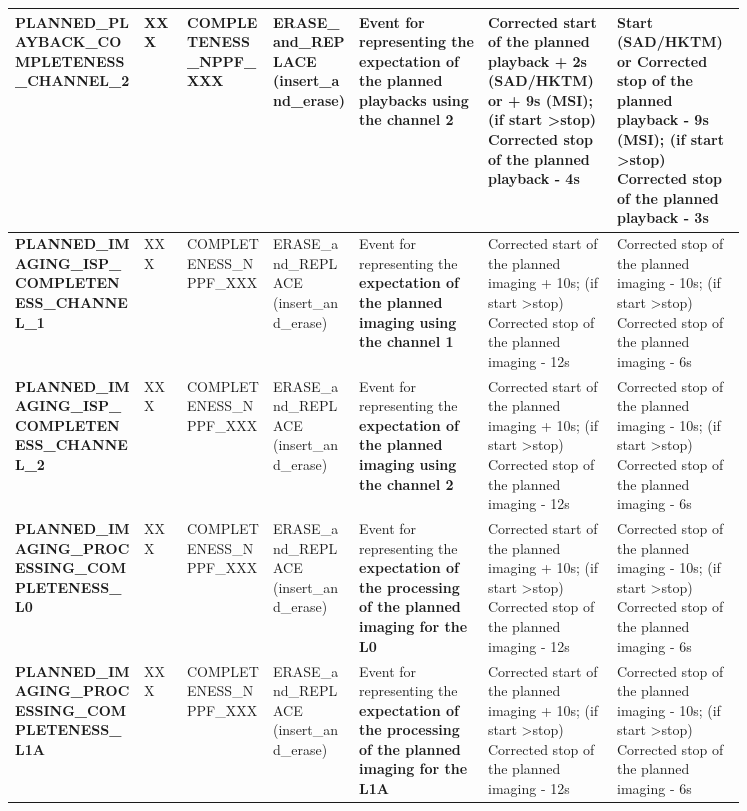 \begin{landscape}
\begin{longtable}{|M{0.15\linewidth}|M{0.05\linewidth}|M{0.10\linewidth}|M{0.10\linewidth}|M{0.15\linewidth}|M{0.15\linewidth}|M{0.15\linewidth}|}
\textbf{PLANNED\_PLAYBACK\_COMPLETENESS\_CHANNEL\_2} & XXX & \- COMPLETENESS\_NPPF\_XXX & ERASE\_and\_REPLACE (insert\_and\_erase) & Event for representing the \textbf{expectation of the planned playbacks using the channel 2} & Corrected start of the planned playback + 2s (SAD/HKTM) or + 9s (MSI); (if start \textgreater  stop) Corrected stop of the planned playback - 4s & Start (SAD/HKTM) or Corrected stop of the planned playback - 9s (MSI); (if start \textgreater  stop) Corrected stop of the planned playback - 3s \\ \hline
\textbf{PLANNED\_IMAGING\_ISP\_COMPLETENESS\_CHANNEL\_1} & XXX & \- COMPLETENESS\_NPPF\_XXX & ERASE\_and\_REPLACE (insert\_and\_erase) & Event for representing the \textbf{expectation of the planned imaging using the channel 1} & Corrected start of the planned imaging + 10s; (if start \textgreater  stop) Corrected stop of the planned imaging - 12s & Corrected stop of the planned imaging - 10s; (if start \textgreater  stop) Corrected stop of the planned imaging - 6s \\ \hline
\textbf{PLANNED\_IMAGING\_ISP\_COMPLETENESS\_CHANNEL\_2} & XXX & \- COMPLETENESS\_NPPF\_XXX & ERASE\_and\_REPLACE (insert\_and\_erase) & Event for representing the \textbf{expectation of the planned imaging using the channel 2} & Corrected start of the planned imaging + 10s; (if start \textgreater  stop) Corrected stop of the planned imaging - 12s & Corrected stop of the planned imaging - 10s; (if start \textgreater  stop) Corrected stop of the planned imaging - 6s \\ \hline
\textbf{PLANNED\_IMAGING\_PROCESSING\_COMPLETENESS\_L0} & XXX & \- COMPLETENESS\_NPPF\_XXX & ERASE\_and\_REPLACE (insert\_and\_erase) & Event for representing the \textbf{expectation of the processing of the planned imaging for the L0} & Corrected start of the planned imaging + 10s; (if start \textgreater  stop) Corrected stop of the planned imaging - 12s & Corrected stop of the planned imaging - 10s; (if start \textgreater  stop) Corrected stop of the planned imaging - 6s \\ \hline
\textbf{PLANNED\_IMAGING\_PROCESSING\_COMPLETENESS\_L1A} & XXX & \- COMPLETENESS\_NPPF\_XXX & ERASE\_and\_REPLACE (insert\_and\_erase) & Event for representing the \textbf{expectation of the processing of the planned imaging for the L1A} & Corrected start of the planned imaging + 10s; (if start \textgreater  stop) Corrected stop of the planned imaging - 12s & Corrected stop of the planned imaging - 10s; (if start \textgreater  stop) Corrected stop of the planned imaging - 6s \\ \hline

\end{longtable}
\end{landscape}
